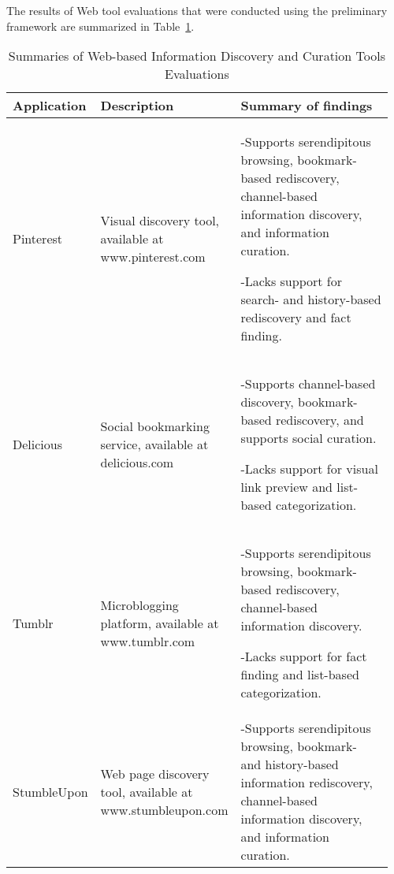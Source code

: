 \label{chapter:appendix_tools}

The results of Web tool evaluations that were conducted using the preliminary framework are summarized in Table~\ref{table:tool_summaries}.

\begin{longtable}{|p{0.16\linewidth}| p{0.30\linewidth}| p{0.50\linewidth}|}
\caption{Summaries of Web-based Information Discovery and Curation Tools Evaluations}
\label{table:tool_summaries} \\

\hline
Application     & Description                                                                  & Summary of findings                                                                                                                                                                                                                                                                                            
\\
\hline
Pinterest       & \raggedright
Visual discovery tool, available at www.pinterest.com                        &
-\hspace{0.4cm}Supports serendipitous browsing, bookmark-based rediscovery, channel-based information discovery, and information curation. 


-\hspace{0.4cm}Lacks support for search- and history-based rediscovery and fact finding.                                                                       \\
\hline
Delicious       & \raggedright
Social bookmarking service, available at delicious.com &                                                                -\hspace{0.4cm}Supports channel-based discovery, bookmark-based rediscovery, and supports social curation. 

-\hspace{0.4cm}Lacks support for visual link preview and list-based categorization. \\
\hline
Tumblr          & \raggedright Microblogging platform, available at www.tumblr.com                         &-\hspace{0.4cm}Supports serendipitous browsing, bookmark-based rediscovery, channel-based information discovery.

-\hspace{0.4cm}Lacks support for fact finding and list-based categorization.                                                                                                 \\
\hline
StumbleUpon     & \raggedright Web page discovery tool, available at www.stumbleupon.com                    & -\hspace{0.4cm}Supports serendipitous browsing, bookmark- and history-based information rediscovery, channel-based information discovery, and information curation. 


\end{longtable}
